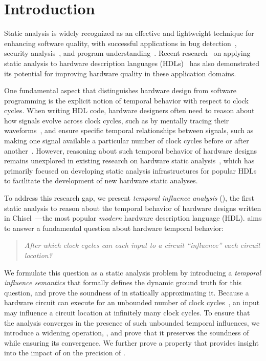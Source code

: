 \section{Introduction}

Static analysis is widely recognized as an effective and lightweight technique for enhancing software quality, with successful applications in bug detection~\cite{dura_javadl_2021,le_finding_2022,li_enhancing_2024,cai_canary_2021,chandra_snugglebug_2009}, security analysis~\cite{arzt_flowdroid_2014,ferreira_efficient_2024,liang_pointer_2025,lipp_empirical_2022}, and program understanding~\cite{sridharan_thin_2007,li_program_2016}.
Recent research~\cite{cui_chisa_2026,chen_exploiting_2026} on applying static analysis to hardware description languages (HDLs)~\cite{bachrach_chisel_2012,ieee_verilog,ieee_systemverilog} has also demonstrated its potential for improving hardware quality in these application domains.

One fundamental aspect that distinguishes hardware design from software programming is the explicit notion of temporal behavior with respect to clock cycles.
When writing HDL code, hardware designers often need to reason about how signals evolve across clock cycles, such as by mentally tracing their waveforms~\cite{vcd-waveform}, and ensure specific temporal relationships between signals, such as making one signal available a particular number of clock cycles before or after another~\cite{temporal-relationship}.
However, reasoning about such temporal behavior of hardware designs remains unexplored in existing research on hardware static analysis~\cite{cui_chisa_2026,chen_exploiting_2026}, which has primarily focused on developing static analysis infrastructures for popular HDLs~\cite{bachrach_chisel_2012,ieee_verilog,ieee_systemverilog} to facilitate the development of new hardware static analyses.

To address this research gap, we present \emph{temporal influence analysis} (\tia), the first static analysis to reason about the temporal behavior of hardware designs written in Chisel~\cite{bachrach_chisel_2012,izraelevitz_reusability_2017}---the most popular \emph{modern} hardware description language (HDL).
\tia aims to answer a fundamental question about hardware temporal behavior:
\begin{quote}
    \textit{After which clock cycles can each input to a circuit ``influence'' each circuit location?}
\end{quote}
We formulate this question as a static analysis problem by introducing a \emph{temporal influence semantics} that formally defines the dynamic ground truth for this question, and prove the soundness of \tia in statically approximating it.
Because a hardware circuit can execute for an unbounded number of clock cycles~\cite{cui_chisa_2026}, an input may influence a circuit location at infinitely many clock cycles.
To ensure that the analysis converges in the presence of such unbounded temporal influences, we introduce a widening operation, \widening, and prove that it preserves the soundness of \tia while ensuring its convergence.
We further prove a property that provides insight into the impact of \widening on the precision of \tia.

